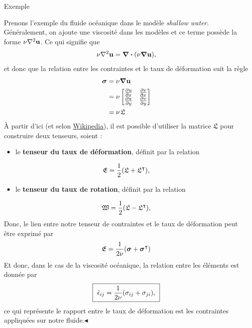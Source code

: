 \documentclass[10pt]{article}
\numberwithin{equation}{section}
\newcommand{\uu}{\vb{u}}
\newcommand{\pt}{\hspace{1pt}} %
\newcommand{\exemple}{
\parbox[center]{2.2cm}{\begin{tcolorbox}[sharp corners, rounded corners=northeast, rounded corners=southeast,
colback=Violet!5, colframe=black,
size=small, width=2cm, left=-0.25pt, bottom=-0.5pt,
arc is angular, arc=2.5mm, boxrule=0.35pt, leftrule=4pt, %
after={\enskip}] Exemple \end{tcolorbox}}}
\newcommand{\cqfd}{\hfill$\blacktriangleleft$}
\begin{document}
\exemple Prenons l'exemple du fluide océanique dans le modèle \emph{shallow water}.
Généralement, on ajoute une viscosité dans les modèles et ce terme possède la forme \(\nu\laplacian{\uu}\).
Ce qui signifie que
\begin{align}
   \nu\laplacian{\uu} = \divergence{\qty(\nu\gradient{\uu})},
\end{align}
et donc que la relation entre les contraintes et le taux de déformation suit la règle
\begin{align}
   \boldsymbol{\sigma}
   &= \nu\gradient{\uu} \nonumber\\
   &= \nu \begin{bmatrix}
     \pdv{u}{x} & \pdv{v}{x} \\
     \pdv{u}{y} & \pdv{v}{y} \\
   \end{bmatrix}\nonumber\\
   &= \nu\pt \mathfrak{L}
\end{align}
À partir d'ici (et selon \href{https://en.wikipedia.org/wiki/Strain-rate\_tensor}{Wikipedia}), il est possible d'utiliser la matrice \(\mathfrak{L}\) pour construire deux tenseurs, soient :
\begin{itemize}
\item le \textbf{tenseur du taux de déformation}, définit par la relation
\end{itemize}
\begin{equation}
   \mathfrak{E} = \frac{1}{2}\qty(\mathfrak{L} + \mathfrak{L}^\intercal),
\end{equation}
\begin{itemize}
\item le \textbf{tenseur du taux de rotation}, définit par la relation
\end{itemize}
\begin{equation}
   \mathfrak{W} = \frac{1}{2}\qty(\mathfrak{L} - \mathfrak{L}^\intercal),
\end{equation}
Donc, le lien entre notre tenseur de contraintes et le taux de déformation peut être exprimé par
\begin{equation}
   \mathfrak{E} = \frac{1}{2\nu}\qty(\boldsymbol{\sigma} + \boldsymbol{\sigma}^\intercal)
\end{equation}
Et donc, dans le cas de la viscosité océanique, la relation entre les éléments est donnée par
\begin{equation}
   \boxed{\ \dot{\epsilon}_{ij} = \frac{1}{2\nu}\qty(\sigma_{ij}+\sigma_{ji}),\ } 
\end{equation}
ce qui représente le rapport entre le taux de déformation est les contraintes appliquées sur notre fluide.\cqfd\bigskip
\end{document}
